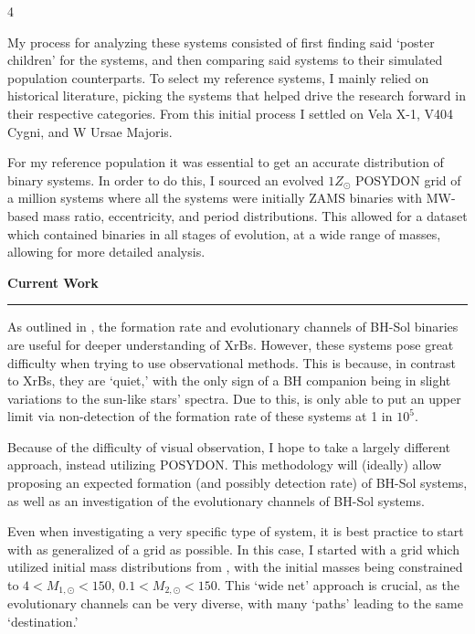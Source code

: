 \documentclass{article}
\begin{document}
\begin{multicols}{4}
\begin{tcolorbox}[sectionbox=Introduction]
    My process for analyzing these systems consisted of first finding said `poster children' for the systems, and then comparing said systems to their simulated population counterparts. To select my reference systems, I mainly relied on historical literature, picking the systems that helped drive the research forward in their respective categories. From this initial process I settled on Vela X-1, V404 Cygni, and W Ursae Majoris.

    For my reference population it was essential to get an accurate distribution of binary systems. In order to do this, I sourced an evolved \(1Z_\odot\) POSYDON grid of a million systems where all the systems were initially ZAMS binaries with MW-based mass ratio, eccentricity, and period distributions. This allowed for a dataset which contained binaries in all stages of evolution, at a wide range of masses, allowing for more detailed analysis.
  
  \textbf{Current Work}
  \vspace{.5cm}
  \hrule
  \vspace{.5cm} 
    As outlined in \cite{green_upper_2025}, the formation rate and evolutionary channels of BH-Sol binaries are useful for deeper understanding of XrBs. However, these systems pose great difficulty when trying to use observational methods. This is because, in contrast to XrBs, they are `quiet,' with the only sign of a BH companion being in slight variations to the sun-like stars' spectra. Due to this, \cite{green_upper_2025} is only able to put an upper limit via non-detection of the formation rate of these systems at 1 in \(10^5\).

    Because of the difficulty of visual observation, I hope to take a largely different approach, instead utilizing POSYDON. This methodology will (ideally) allow proposing an expected formation (and possibly detection rate) of BH-Sol systems, as well as an investigation of the evolutionary channels of BH-Sol systems.

    Even when investigating a very specific type of system, it is best practice to start with as generalized of a grid as possible. In this case, I started with a grid which utilized initial mass distributions from \cite{moe_mind_2017}, with the initial masses being constrained to \(4< M_{1, \odot} < 150\), \(0.1< M_{2, \odot} < 150\). This `wide net' approach is crucial, as the evolutionary channels can be very diverse, with many `paths' leading to the same `destination.'
    
\end{tcolorbox}


\end{multicols}
\end{document}
